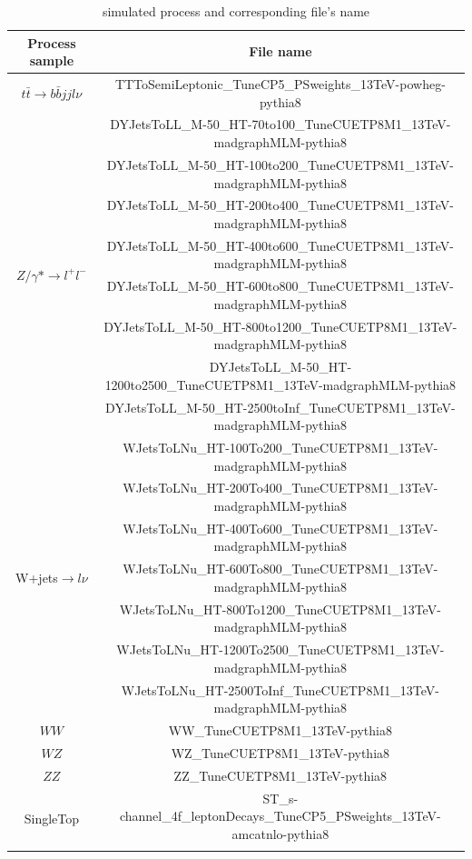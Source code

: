 		\begin{center}
		\begin{longtable}{ c c }
		\caption{simulated process and corresponding file's name} \\
		\hline
		Process sample & File name \\ 
		\hline
		$t$$\bar{t}\rightarrow b \bar{b}jjl\nu$ & TTToSemiLeptonic\_TuneCP5\_PSweights\_13TeV-powheg-pythia8 \\
		\hline
		\multirow{8}{2em}{$Z / \gamma * \rightarrow l^+ l^-$} & DYJetsToLL\_M-50\_HT-70to100\_TuneCUETP8M1\_13TeV-madgraphMLM-pythia8 \\
		 & DYJetsToLL\_M-50\_HT-100to200\_TuneCUETP8M1\_13TeV-madgraphMLM-pythia8 \\
		 & DYJetsToLL\_M-50\_HT-200to400\_TuneCUETP8M1\_13TeV-madgraphMLM-pythia8 \\
		 & DYJetsToLL\_M-50\_HT-400to600\_TuneCUETP8M1\_13TeV-madgraphMLM-pythia8 \\
		 & DYJetsToLL\_M-50\_HT-600to800\_TuneCUETP8M1\_13TeV-madgraphMLM-pythia8 \\
		 & DYJetsToLL\_M-50\_HT-800to1200\_TuneCUETP8M1\_13TeV-madgraphMLM-pythia8 \\
		 & DYJetsToLL\_M-50\_HT-1200to2500\_TuneCUETP8M1\_13TeV-madgraphMLM-pythia8 \\
		 & DYJetsToLL\_M-50\_HT-2500toInf\_TuneCUETP8M1\_13TeV-madgraphMLM-pythia8 \\
		\hline
		\multirow{7}{2em}{W+jets$\rightarrow l \nu$} & WJetsToLNu\_HT-100To200\_TuneCUETP8M1\_13TeV-madgraphMLM-pythia8 \\
		 & WJetsToLNu\_HT-200To400\_TuneCUETP8M1\_13TeV-madgraphMLM-pythia8 \\
		 & WJetsToLNu\_HT-400To600\_TuneCUETP8M1\_13TeV-madgraphMLM-pythia8 \\
		 & WJetsToLNu\_HT-600To800\_TuneCUETP8M1\_13TeV-madgraphMLM-pythia8 \\
		 & WJetsToLNu\_HT-800To1200\_TuneCUETP8M1\_13TeV-madgraphMLM-pythia8 \\
		 & WJetsToLNu\_HT-1200To2500\_TuneCUETP8M1\_13TeV-madgraphMLM-pythia8 \\
		 & WJetsToLNu\_HT-2500ToInf\_TuneCUETP8M1\_13TeV-madgraphMLM-pythia8 \\
		\hline
		$WW$ & WW\_TuneCUETP8M1\_13TeV-pythia8 \\
		$WZ$ & WZ\_TuneCUETP8M1\_13TeV-pythia8 \\
		$ZZ$ & ZZ\_TuneCUETP8M1\_13TeV-pythia8 \\
		\hline
		\multirow{5}{2em}{SingleTop} & ST\_s-channel\_4f\_leptonDecays\_TuneCP5\_PSweights\_13TeV-amcatnlo-pythia8 \\
$$
\end{longtable}
\end{center}
